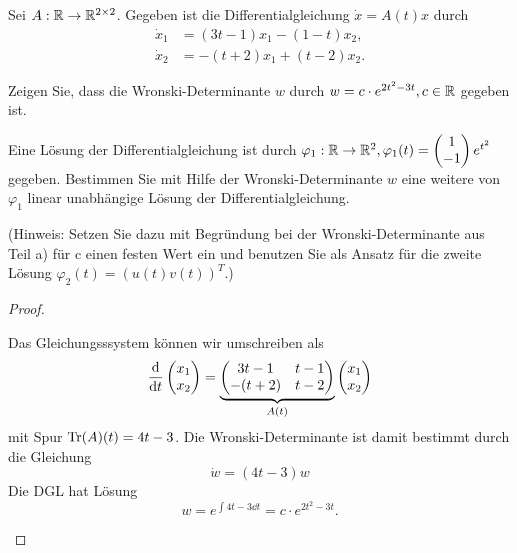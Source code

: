 \begin{Problem}
	Sei $A:\mathbb{R}\to \mathbb{R}^{2\times 2}$. Gegeben ist die Differentialgleichung $\dot{x} = A(t)x$ durch
	\begin{align*}
		\dot{x}_1&= (3t-1)x_1-(1-t)x_2,\\
		\dot{x}_2&= -(t+2)x_1 + (t-2)x_2.
	\end{align*}
	\begin{parts}
		\item  Zeigen Sie, dass die Wronski-Determinante $w$ durch $w = c\cdot e^{2t^2-3t}, c \in \mathbb{R}$ gegeben ist.
		\item Eine Lösung der Differentialgleichung ist durch $\varphi_1 : \mathbb{R} \to \mathbb{R}^2 , \varphi_1 (t) =
		\begin{pmatrix} 1 \\ -1 \end{pmatrix}e^{t^2}$ gegeben. Bestimmen Sie mit Hilfe der Wronski-Determinante $w$ eine weitere von $\varphi_1$ linear unabhängige Lösung der Differentialgleichung.
		
		(Hinweis: Setzen Sie dazu mit Begründung bei der Wronski-Determinante aus Teil a) für c einen festen Wert ein und benutzen Sie als Ansatz für die zweite Lösung $\varphi_2 (t) = (u(t) v(t))^T$.)
	\end{parts}
\end{Problem}
\begin{proof}
	\begin{parts}
		\item Das Gleichungsssystem können wir umschreiben als
		\[\dv{t}\begin{pmatrix} x_1 \\ x_2\end{pmatrix}= \underbrace{\begin{pmatrix}
		3t-1 & t-1 \\
		-(t+2) & t-2 
		\end{pmatrix}}_{A(t)}
		\begin{pmatrix}
			x_1\\
			x_2
		\end{pmatrix}\]
		mit Spur $\Tr(A)(t)=4t-3$. Die Wronski-Determinante ist damit bestimmt durch die Gleichung
		\[\dot{w}=(4t-3)w\]
		Die DGL hat L\"{o}sung
		\[w = e^{\int 4t-3 \dd{t}}=c\cdot e^{2t^2 - 3t}.\]
		\item 
	\end{parts}
\end{proof}


